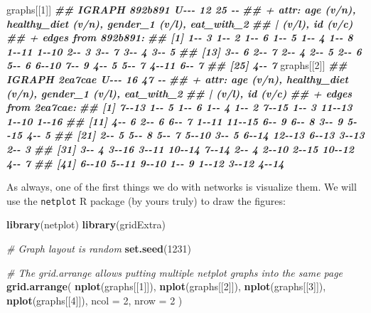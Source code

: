 \documentclass[
]{book}
\newenvironment{Shaded}{\begin{snugshade}}{\end{snugshade}}
\newcommand{\AttributeTok}[1]{\textcolor[rgb]{0.13,0.29,0.53}{#1}}
\newcommand{\CommentTok}[1]{\textcolor[rgb]{0.56,0.35,0.01}{\textit{#1}}}
\newcommand{\DecValTok}[1]{\textcolor[rgb]{0.00,0.00,0.81}{#1}}
\newcommand{\DocumentationTok}[1]{\textcolor[rgb]{0.56,0.35,0.01}{\textbf{\textit{#1}}}}
\newcommand{\FunctionTok}[1]{\textcolor[rgb]{0.13,0.29,0.53}{\textbf{#1}}}
\newcommand{\NormalTok}[1]{#1}
\begin{document}
\begin{Shaded}
\begin{Highlighting}[]
\NormalTok{graphs[[}\DecValTok{1}\NormalTok{]]}
\DocumentationTok{\#\# IGRAPH 892b891 U{-}{-}{-} 12 25 {-}{-} }
\DocumentationTok{\#\# + attr: age (v/n), healthy\_diet (v/n), gender\_1 (v/l), eat\_with\_2}
\DocumentationTok{\#\# | (v/l), id (v/c)}
\DocumentationTok{\#\# + edges from 892b891:}
\DocumentationTok{\#\#  [1] 1{-}{-} 3 1{-}{-} 2 1{-}{-} 6 1{-}{-} 5 1{-}{-} 4 1{-}{-} 8 1{-}{-}11 1{-}{-}10 2{-}{-} 3 3{-}{-} 7 3{-}{-} 4 3{-}{-} 5}
\DocumentationTok{\#\# [13] 3{-}{-} 6 2{-}{-} 7 2{-}{-} 4 2{-}{-} 5 2{-}{-} 6 5{-}{-} 6 6{-}{-}10 7{-}{-} 9 4{-}{-} 5 5{-}{-} 7 4{-}{-}11 6{-}{-} 7}
\DocumentationTok{\#\# [25] 4{-}{-} 7}
\NormalTok{graphs[[}\DecValTok{2}\NormalTok{]]}
\DocumentationTok{\#\# IGRAPH 2ea7cae U{-}{-}{-} 16 47 {-}{-} }
\DocumentationTok{\#\# + attr: age (v/n), healthy\_diet (v/n), gender\_1 (v/l), eat\_with\_2}
\DocumentationTok{\#\# | (v/l), id (v/c)}
\DocumentationTok{\#\# + edges from 2ea7cae:}
\DocumentationTok{\#\#  [1]  7{-}{-}13  1{-}{-} 5  1{-}{-} 6  1{-}{-} 4  1{-}{-} 2  7{-}{-}15  1{-}{-} 3 11{-}{-}13  1{-}{-}10  1{-}{-}16}
\DocumentationTok{\#\# [11]  4{-}{-} 6  2{-}{-} 6  6{-}{-} 7  1{-}{-}11 11{-}{-}15  6{-}{-} 9  6{-}{-} 8  3{-}{-} 9  5{-}{-}15  4{-}{-} 5}
\DocumentationTok{\#\# [21]  2{-}{-} 5  5{-}{-} 8  5{-}{-} 7  5{-}{-}10  3{-}{-} 5  6{-}{-}14 12{-}{-}13  6{-}{-}13  3{-}{-}13  2{-}{-} 3}
\DocumentationTok{\#\# [31]  3{-}{-} 4  3{-}{-}16  3{-}{-}11 10{-}{-}14  7{-}{-}14  2{-}{-} 4  2{-}{-}10  2{-}{-}15 10{-}{-}12  4{-}{-} 7}
\DocumentationTok{\#\# [41]  6{-}{-}10  5{-}{-}11  9{-}{-}10  1{-}{-} 9  1{-}{-}12  3{-}{-}12  4{-}{-}14}
\end{Highlighting}
\end{Shaded}

As always, one of the first things we do with networks is visualize them. We will use the \texttt{netplot} R package (by yours truly) to draw the figures:

\begin{Shaded}
\begin{Highlighting}[]
\FunctionTok{library}\NormalTok{(netplot)}
\FunctionTok{library}\NormalTok{(gridExtra)}

\CommentTok{\# Graph layout is random}
\FunctionTok{set.seed}\NormalTok{(}\DecValTok{1231}\NormalTok{)}

\CommentTok{\# The grid.arrange allows putting multiple netplot graphs into the same page}
\FunctionTok{grid.arrange}\NormalTok{(}
  \FunctionTok{nplot}\NormalTok{(graphs[[}\DecValTok{1}\NormalTok{]]),}
  \FunctionTok{nplot}\NormalTok{(graphs[[}\DecValTok{2}\NormalTok{]]),}
  \FunctionTok{nplot}\NormalTok{(graphs[[}\DecValTok{3}\NormalTok{]]),}
  \FunctionTok{nplot}\NormalTok{(graphs[[}\DecValTok{4}\NormalTok{]]),}
  \AttributeTok{ncol =} \DecValTok{2}\NormalTok{, }\AttributeTok{nrow =} \DecValTok{2}
\NormalTok{)}
\end{Highlighting}
\end{Shaded}
\end{document}
